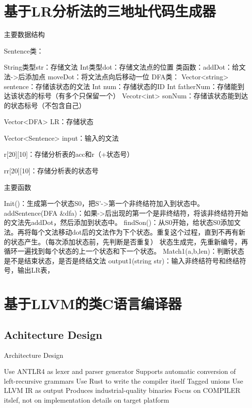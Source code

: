 \documentclass[aspectratio=1610]{ctexbeamer}
\begin{document}
\section{基于LR分析法的三地址代码生成器}
\begin{frame}{主要数据结构}
    \begin{outline}
        \1 Sentence类：

        \2 String类型str：存储文法
        \2 Int类型dot：存储文法点的位置
        \3 类函数：addDot：给文法->后添加点
        \2 moveDot：将文法点向后移动一位
        \1 DFA类：
        \2 Vector<string> sentence：存储该状态的文法
        \2 Int num：存储状态的ID
        \2 Int fatherNum：存储能到达该状态的标号（有多个只保留一个）
        \2 Vecotr<int> sonNum：存储该状态能到达的状态标号（不包含自己）
    \end{outline}
    Vector<DFA> LR：存储状态

    Vector<Sentence> input：输入的文法

    r[20][10]：存储分析表的acc和r（+状态号）

    rr[20][10]：存储分析表的状态号

\end{frame}

\begin{frame}{主要函数}
    \begin{outline}
        \1 Init()：生成第一个状态S0，把S’->第一个非终结符加入到状态中。
        \1 addSentence(DFA \&dfa)：如果->后出现的第一个是非终结符，将该非终结符开始的文法先addDot，然后添加到状态中。
        \1 findSon()：从S0开始，给状态S0添加文法。再将每个文法移动dot后的文法作为下个状态。重复这个过程，直到不再有新的状态产生。（每次添加状态前，先判断是否重复）
        \1 状态生成完，先重新编号，再循环一遍找到每个状态的上一个状态和下一个状态。
        \1 Match1(a,b,len)：判断状态是不是结束状态，是否是终结文法
        \1 output1(string str)：输入非终结符号和终结符号，输出LR表，
    \end{outline}
\end{frame}

\section{基于LLVM的类C语言编译器}

\subsection{Achitecture Design}

\begin{frame}{Architecture Design}
    \begin{outline}
        \1 Use ANTLR4 as lexer and parser generator
            \2 Supports automatic conversion of left-recursive grammars
        \1 Use Rust to write the compiler itself
            \2 Tagged unions
        \1 Use LLVM IR as output
            \2 Produces industrial-quality binaries
            \2 Focus on COMPILER itslef, not on implementation details on target platform
    \end{outline}
\end{frame}
\end{document}
